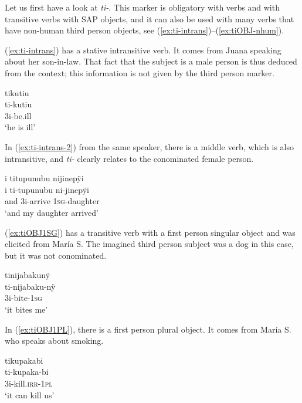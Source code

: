 Let us first have a look at \textit{ti-}. This marker is obligatory with  verbs and with transitive verbs with SAP objects, and it can also be used with many  verbs that have non-human third person objects, see (\ref{ex:ti-intrans})--(\ref{ex:tiOBJ-nhum}).

(\ref{ex:ti-intrans}) has a stative intransitive verb. It comes from Juana speaking about her son-in-law. That fact that the subject is a male person is thus deduced from the context; this information is not given by the third person marker.

\ea\label{ex:ti-intrans}
\begingl 
\glpreamble tikutiu\\
\gla ti-kutiu\\ 
\glb 3i-be.ill\\ 
\glft ‘he is ill’
\trailingcitation{[jxx-p110923l-1.043]}
\xe

In (\ref{ex:ti-intrans-2}) from the same speaker, there is a middle verb, which is also intransitive, and \textit{ti-} clearly relates to the conominated female person.

\ea\label{ex:ti-intrans-2}
\begingl
\glpreamble i titupunubu nijinepÿi\\
\gla i ti-tupunubu ni-jinepÿi\\
\glb and 3i-arrive 1\textsc{sg}-daughter\\
\glft ‘and my daughter arrived’
\endgl
\trailingcitation{[jxx-p120430l-1.267]}
\xe

(\ref{ex:tiOBJ1SG}) has a transitive verb with a first person singular object and was elicited from María S. The imagined third person subject was a dog in this case, but it was not conominated.

\ea\label{ex:tiOBJ1SG}
\begingl 
\glpreamble tinijabakunÿ\\
\gla ti-nijabaku-nÿ\\ 
\glb 3i-bite-1\textsc{sg}\\ 
\glft ‘it bites me’
\trailingcitation{[rxx-e181018le]}
\xe

In (\ref{ex:tiOBJ1PL}), there is a first person plural object. It comes from María S. who speaks about smoking.

\ea\label{ex:tiOBJ1PL}
\begingl
\glpreamble tikupakabi\\
\gla ti-kupaka-bi\\
\glb 3i-kill.\textsc{irr}-1\textsc{pl}\\
\glft ‘it can kill us’
\endgl
\trailingcitation{[rxx-e120511l.385]}
\xe

